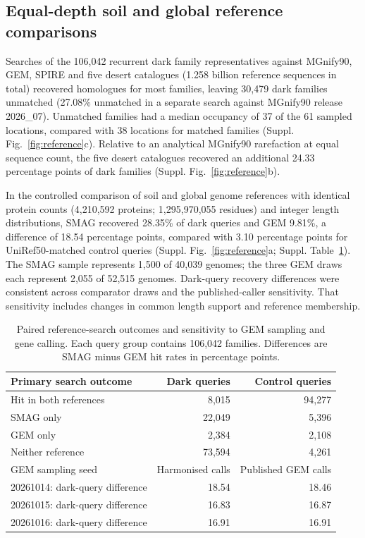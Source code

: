 \subsection*{Equal-depth soil and global reference comparisons}
Searches of the 106,042 recurrent dark family representatives against MGnify90, GEM, SPIRE and five desert catalogues (1.258 billion reference sequences in total) recovered homologues for most families, leaving 30,479 dark families unmatched (27.08\% unmatched in a separate search against MGnify90 release 2026\_07). Unmatched families had a median occupancy of 37 of the 61 sampled locations, compared with 38 locations for matched families (Suppl. Fig.~\ref{fig:reference}c). Relative to an analytical MGnify90 rarefaction at equal sequence count, the five desert catalogues recovered an additional 24.33 percentage points of dark families (Suppl. Fig.~\ref{fig:reference}b).

In the controlled comparison of soil and global genome references with identical protein counts (4,210,592 proteins; 1,295,970,055 residues) and integer length distributions, SMAG recovered 28.35\% of dark queries and GEM 9.81\%, a difference of 18.54 percentage points, compared with 3.10 percentage points for UniRef50-matched control queries (Suppl. Fig.~\ref{fig:reference}a; Suppl. Table~\ref{tab:matched_refs}). The SMAG sample represents 1,500 of 40,039 genomes; the three GEM draws each represent 2,055 of 52,515 genomes. Dark-query recovery differences were consistent across comparator draws and the published-caller sensitivity. That sensitivity includes changes in common length support and reference membership.

\begin{table}[ht]\centering\small
\caption{Paired reference-search outcomes and sensitivity to GEM sampling and gene calling. Each query group contains 106,042 families. Differences are SMAG minus GEM hit rates in percentage points.}\label{tab:matched_refs}
\begin{tabular}{lrr}\toprule
Primary search outcome & Dark queries & Control queries\\\midrule
Hit in both references & 8,015 & 94,277\\
SMAG only & 22,049 & 5,396\\
GEM only & 2,384 & 2,108\\
Neither reference & 73,594 & 4,261\\\midrule
GEM sampling seed & Harmonised calls & Published GEM calls\\\midrule
20261014: dark-query difference & 18.54 & 18.46\\
20261015: dark-query difference & 16.83 & 16.87\\
20261016: dark-query difference & 16.91 & 16.91\\\bottomrule
\end{tabular}
\end{table}

